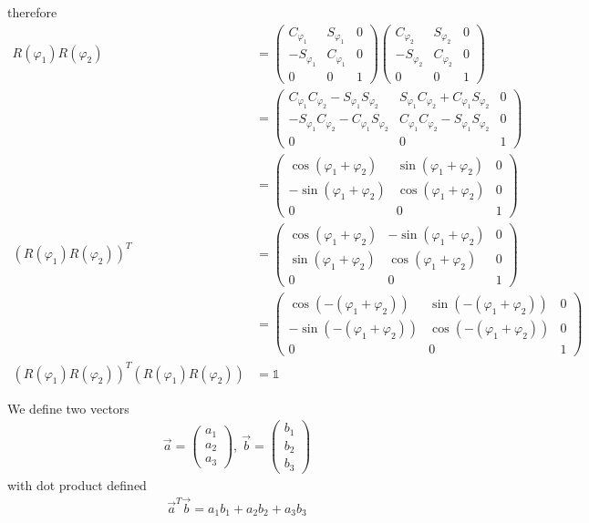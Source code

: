 \documentclass[11pt,a4paper]{article}
\begin{document}
\begin{enumerate}
therefore
\begin{align*}
R(\varphi_1)R(\varphi_2)
&=
\begin{pmatrix}
C_{\varphi_1} & S_{\varphi_1} & 0 \\
-S_{\varphi_1} & C_{\varphi_1} & 0 \\
0 & 0 & 1
\end{pmatrix}
\begin{pmatrix}
C_{\varphi_2} & S_{\varphi_2} & 0 \\
-S_{\varphi_2} & C_{\varphi_2} & 0 \\
0 & 0 & 1
\end{pmatrix} \\
&=
\begin{pmatrix}
C_{\varphi_1}C_{\varphi_2}-S_{\varphi_1}S_{\varphi_2} & S_{\varphi_1}C_{\varphi_2}+C_{\varphi_1}S_{\varphi_2} & 0 \\
-S_{\varphi_1}C_{\varphi_2}-C_{\varphi_1}S_{\varphi_2} & C_{\varphi_1}C_{\varphi_2}-S_{\varphi_1}S_{\varphi_2} & 0 \\
0 & 0 & 1
\end{pmatrix} \\
&=
\begin{pmatrix}
\cos(\varphi_1+\varphi_2) & \sin(\varphi_1+\varphi_2) & 0 \\
-\sin(\varphi_1+\varphi_2) & \cos(\varphi_1+\varphi_2) & 0 \\
0 & 0 & 1
\end{pmatrix} \\
(R(\varphi_1)R(\varphi_2))^T
&=
\begin{pmatrix}
\cos(\varphi_1+\varphi_2) & -\sin(\varphi_1+\varphi_2) & 0 \\
\sin(\varphi_1+\varphi_2) & \cos(\varphi_1+\varphi_2) & 0 \\
0 & 0 & 1
\end{pmatrix} \\
&=
\begin{pmatrix}
\cos(-(\varphi_1+\varphi_2)) & \sin(-(\varphi_1+\varphi_2)) & 0 \\
-\sin(-(\varphi_1+\varphi_2)) & \cos(-(\varphi_1+\varphi_2)) & 0 \\
0 & 0 & 1
\end{pmatrix} \\
(R(\varphi_1)R(\varphi_2))^T(R(\varphi_1)R(\varphi_2))&=\mathbb{1}
\end{align*}

We define two vectors
\begin{align*}
\vec{a}=
\begin{pmatrix}
a_1 \\
a_2 \\
a_3
\end{pmatrix},\ 
\vec{b}=
\begin{pmatrix}
b_1 \\
b_2 \\
b_3
\end{pmatrix}
\end{align*}
with dot product defined
\begin{align*}
\vec{a}^T\vec{b}=a_1b_1+a_2b_2+a_3b_3
\end{align*}


\end{enumerate}
\end{document}

